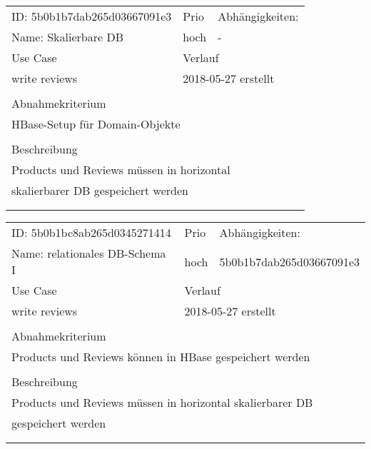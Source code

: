 \documentclass{article}
\begin{document}
\vfill
\resizebox{10cm}{!} {
\begin{tabular}{lllll}
  \hline
  \multicolumn{2}{|l|}{\tiny{ID: 5b0b1b7dab265d03667091e3}} & Prio & \multicolumn{2}{|l|}{Abhängigkeiten:} \\
  \multicolumn{2}{|l|}{Name: Skalierbare DB} & hoch & \multicolumn{2}{|l|}{\tiny{-}} \\
  \hline
  \multicolumn{2}{|l|}{Use Case} & \multicolumn{3}{|l|}{Verlauf} \\
  \multicolumn{2}{|l|}{write reviews} & \multicolumn{3}{|l|}{2018-05-27 erstellt} \\
  \multicolumn{2}{|l|}{} & \multicolumn{3}{|l|}{} \\
  \hline
  \multicolumn{5}{|l|}{Abnahmekriterium} \\
  \multicolumn{5}{|l|}{HBase-Setup für Domain-Objekte} \\
  \multicolumn{5}{|l|}{} \\
  \hline
  \multicolumn{5}{|l|}{Beschreibung} \\
  \multicolumn{5}{|l|}{Products und Reviews müssen in horizontal} \\
  \multicolumn{5}{|l|}{skalierbarer DB gespeichert werden} \\
  \multicolumn{5}{|l|}{} \\
  \multicolumn{5}{|l|}{} \\
  \hline
\end{tabular}
}
\resizebox{10cm}{!} {
\begin{tabular}{lllll}
  \hline
  \multicolumn{2}{|l|}{\tiny{ID: 5b0b1bc8ab265d0345271414}} & Prio & \multicolumn{2}{|l|}{Abhängigkeiten:} \\
  \multicolumn{2}{|l|}{Name: relationales DB-Schema I} & hoch & \multicolumn{2}{|l|}{\tiny{5b0b1b7dab265d03667091e3}} \\
  \hline
  \multicolumn{2}{|l|}{Use Case} & \multicolumn{3}{|l|}{Verlauf} \\
  \multicolumn{2}{|l|}{write reviews} & \multicolumn{3}{|l|}{2018-05-27 erstellt} \\
  \multicolumn{2}{|l|}{} & \multicolumn{3}{|l|}{} \\
  \hline
  \multicolumn{5}{|l|}{Abnahmekriterium} \\
  \multicolumn{5}{|l|}{Products und Reviews können in HBase gespeichert werden} \\
  \multicolumn{5}{|l|}{} \\
  \hline
  \multicolumn{5}{|l|}{Beschreibung} \\
  \multicolumn{5}{|l|}{Products und Reviews müssen in horizontal skalierbarer DB} \\
  \multicolumn{5}{|l|}{gespeichert werden} \\
  \multicolumn{5}{|l|}{} \\
  \multicolumn{5}{|l|}{} \\
  \hline
\end{tabular}
}
\end{document}
